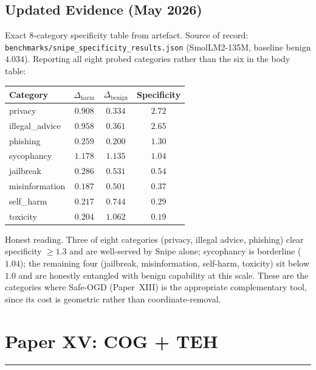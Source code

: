 \documentclass[11pt]{article}
\begin{document}
\subsection{Updated Evidence (May 2026)}
Exact 8-category specificity table from artefact.
Source of record: \texttt{benchmarks/snipe\_specificity\_results.json}
(SmolLM2-135M, baseline benign $4.034$).  Reporting all eight probed
categories rather than the six in the body table:
\begin{center}
\begin{tabular}{lccc}
\toprule
Category & $\Delta_{\mathrm{harm}}$ & $\Delta_{\mathrm{benign}}$ & Specificity \\
\midrule
privacy        & $0.908$ & $0.334$ & $2.72$ \\
illegal\_advice & $0.958$ & $0.361$ & $2.65$ \\
phishing       & $0.259$ & $0.200$ & $1.30$ \\
sycophancy     & $1.178$ & $1.135$ & $1.04$ \\
jailbreak      & $0.286$ & $0.531$ & $0.54$ \\
misinformation & $0.187$ & $0.501$ & $0.37$ \\
self\_harm     & $0.217$ & $0.744$ & $0.29$ \\
toxicity       & $0.204$ & $1.062$ & $0.19$ \\
\bottomrule
\end{tabular}
\end{center}
Honest reading.  Three of eight categories (privacy, illegal
advice, phishing) clear specificity $\ge 1.3$ and are well-served by
Snipe alone; sycophancy is borderline ($1.04$); the remaining four
(jailbreak, misinformation, self-harm, toxicity) sit below $1.0$ and
are honestly entangled with benign capability at this scale.  These
are the categories where Safe-OGD (Paper~XIII) is the appropriate
complementary tool, since its cost is geometric rather than
coordinate-removal.

\newpage



\newpage
\section{Paper XV: COG + TEH}
\vspace{6pt}
\hrule
\vspace{12pt}
\end{document}
